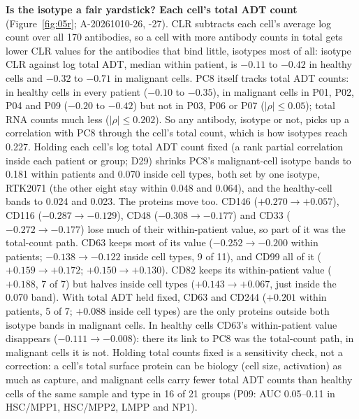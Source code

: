 \textbf{Is the isotype a fair yardstick? Each cell's total ADT count} (Figure~\ref{fig:05r}; A-20261010-26, -27). CLR subtracts each cell's average log count over all 170 antibodies, so a cell with more antibody counts in total gets lower CLR values for the antibodies that bind little, isotypes most of all: isotype CLR against log total ADT, median within patient, is $-0.11$ to $-0.42$ in healthy cells and $-0.32$ to $-0.71$ in malignant cells. PC8 itself tracks total ADT counts: in healthy cells in every patient ($-0.10$ to $-0.35$), in malignant cells in P01, P02, P04 and P09 ($-0.20$ to $-0.42$) but not in P03, P06 or P07 ($|\rho| \leq 0.05$); total RNA counts much less ($|\rho| \leq 0.202$). So any antibody, isotype or not, picks up a correlation with PC8 through the cell's total count, which is how isotypes reach 0.227. Holding each cell's log total ADT count fixed (a rank partial correlation inside each patient or group; D29) shrinks PC8's malignant-cell isotype bands to 0.181 within patients and 0.070 inside cell types, both set by one isotype, RTK2071 (the other eight stay within 0.048 and 0.064), and the healthy-cell bands to 0.024 and 0.023. The proteins move too. CD146 ($+0.270 \to +0.057$), CD116 ($-0.287 \to -0.129$), CD48 ($-0.308 \to -0.177$) and CD33 ($-0.272 \to -0.177$) lose much of their within-patient value, so part of it was the total-count path. CD63 keeps most of its value ($-0.252 \to -0.200$ within patients; $-0.138 \to -0.122$ inside cell types, 9 of 11), and CD99 all of it ($+0.159 \to +0.172$; $+0.150 \to +0.130$). CD82 keeps its within-patient value ($+0.188$, 7 of 7) but halves inside cell types ($+0.143 \to +0.067$, just inside the 0.070 band). With total ADT held fixed, CD63 and CD244 ($+0.201$ within patients, 5 of 7; $+0.088$ inside cell types) are the only proteins outside both isotype bands in malignant cells. In healthy cells CD63's within-patient value disappears ($-0.111 \to -0.008$): there its link to PC8 was the total-count path, in malignant cells it is not. Holding total counts fixed is a sensitivity check, not a correction: a cell's total surface protein can be biology (cell size, activation) as much as capture, and malignant cells carry fewer total ADT counts than healthy cells of the same sample and type in 16 of 21 groups (P09: AUC 0.05--0.11 in HSC/MPP1, HSC/MPP2, LMPP and NP1).

